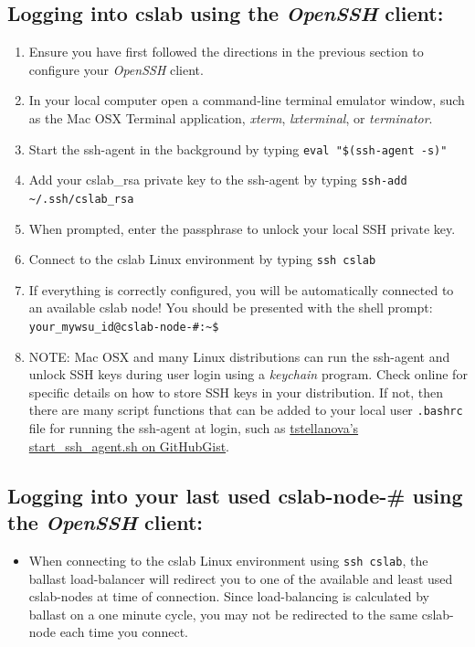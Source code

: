 \documentclass[12pt]{article}
\begin{document}
\begin{flushleft}
\subsection*{Logging into cslab using the \textit{OpenSSH} client:}
\begin{enumerate}
  \item Ensure you have first followed the directions in the previous section to configure your \textit{OpenSSH} client.
  \item In your local computer open a command-line terminal emulator window, such as the Mac OSX Terminal application, \textit{xterm}, \textit{lxterminal}, or \textit{terminator}.
  \item Start the ssh-agent in the background by typing\break
    \verb|eval "$(ssh-agent -s)"|
  \item Add your cslab\_rsa private key to the ssh-agent by typing \break
    \verb|ssh-add ~/.ssh/cslab_rsa|
  \item When prompted, enter the passphrase to unlock your local SSH private key.
  \item Connect to the cslab Linux environment by typing \break
    \verb|ssh cslab|
  \item If everything is correctly configured, you will be automatically connected to an available cslab node! You should be presented with the shell prompt: \break
    \verb|your_mywsu_id@cslab-node-#:~$|
  \item NOTE: Mac OSX and many Linux distributions can run the ssh-agent and unlock SSH keys during user login using a \textit{keychain} program. Check online for specific details on how to store SSH keys in your distribution. If not, then there are many script functions that can be added to your local user \texttt{.bashrc} file for running the ssh-agent at login, such as \href{https://gist.github.com/tstellanova/76ee01c1599d9a9433cf}{tstellanova's start\_ssh\_agent.sh on GitHubGist}.
\end{enumerate}

\newpage
\subsection*{Logging into your last used cslab-node-\# using the \textit{OpenSSH} client:}
\begin{itemize}
  \item When connecting to the cslab Linux environment using \verb|ssh cslab|, the ballast load-balancer will redirect you to one of the available and least used cslab-nodes at time of connection. Since load-balancing is calculated by ballast on a one minute cycle, you may not be redirected to the same cslab-node each time you connect.


\end{itemize}
\end{flushleft}
\end{document}
